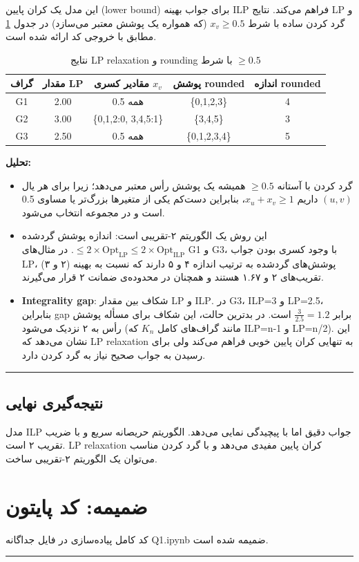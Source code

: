\documentclass[11pt,a4paper]{article}
\newcommand{\en}[1]{\textenglish{#1}}
\newcommand{\separator}{\vspace{1em}\noindent\rule{\linewidth}{0.4pt}\vspace{1em}}
\newcommand{\thickseparator}{\vspace{1em}\noindent\rule{\linewidth}{1pt}\vspace{1em}}
\begin{document}
این مدل یک کران پایین (\en{lower bound}) برای جواب بهینه \en{ILP} فراهم می‌کند. نتایج \en{LP} و گرد کردن ساده با شرط \( x_v \ge 0.5 \) (که همواره یک پوشش معتبر می‌سازد) در جدول \ref{tab:lp} مطابق با خروجی کد ارائه شده است.

\begin{table}[h!]
\centering
\caption{نتایج \en{LP relaxation} و \en{rounding} با شرط \( \ge 0.5 \)}
\label{tab:lp}
\begin{tabular}{|c|c|c|c|c|}
\hline
\textbf{گراف} & \textbf{مقدار \en{LP}} & \textbf{مقادیر کسری \( x_v \)} & \textbf{پوشش \en{rounded}} & \textbf{اندازه \en{rounded}} \\
\hline
\en{G1} & 2.00 & همه 0.5 & \{0,1,2,3\} & 4 \\
\en{G2} & 3.00 & \{0,1,2:0,  3,4,5:1\} & \{3,4,5\} & 3 \\
\en{G3} & 2.50 & همه 0.5 & \{0,1,2,3,4\} & 5 \\
\hline
\end{tabular}
\end{table}

\textbf{تحلیل:}
\begin{itemize}
\item گرد کردن با آستانه \( \ge 0.5 \) همیشه یک پوشش رأس معتبر می‌دهد؛ زیرا برای هر یال \( (u,v) \) داریم \( x_u + x_v \ge 1 \)، بنابراین دست‌کم یکی از متغیرها بزرگ‌تر یا مساوی 0.5 است و در مجموعه انتخاب می‌شود.
\item این روش یک الگوریتم ۲-تقریبی است: اندازه پوشش گردشده \( \le 2 \times \text{Opt}_{\text{LP}} \le 2 \times \text{Opt}_{\text{ILP}} \). در مثال‌های \en{G1} و \en{G3}، با وجود کسری بودن جواب \en{LP}، پوشش‌های گردشده به ترتیب اندازه ۴ و ۵ دارند که نسبت به بهینه (۲ و ۳) تقریب‌های ۲ و ۱.۶۷ هستند و همچنان در محدوده‌ی ضمانت ۲ قرار می‌گیرند.
\item \textbf{\en{Integrality gap}}: شکاف بین مقدار \en{LP} و \en{ILP}. در \en{G3}، \en{ILP}=3 و \en{LP}=2.5، بنابراین \en{gap} برابر \( \frac{3}{2.5}=1.2 \) است. در بدترین حالت، این شکاف برای مسأله پوشش رأس به ۲ نزدیک می‌شود (مانند گراف‌های کامل \( K_n \) که \en{ILP}=n-1 و \en{LP}=n/2). این نشان می‌دهد که \en{LP relaxation} به تنهایی کران پایین خوبی فراهم می‌کند ولی برای رسیدن به جواب صحیح نیاز به گرد کردن دارد.
\end{itemize}

\separator

\subsection*{نتیجه‌گیری نهایی}
مدل \en{ILP} جواب دقیق اما با پیچیدگی نمایی می‌دهد. الگوریتم حریصانه سریع و با ضریب تقریب ۲ است. \en{LP relaxation} کران پایین مفیدی می‌دهد و با گرد کردن مناسب می‌توان یک الگوریتم ۲-تقریبی ساخت.

\appendix
\section{ضمیمه: کد پایتون}
کد کامل پیاده‌سازی در فایل جداگانه \en{Q1.ipynb} ضمیمه شده است.

\thickseparator
\end{document}
